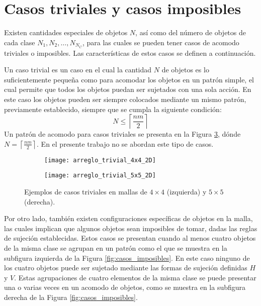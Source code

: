 \section{Casos triviales y casos imposibles}
\label{sec:casos_triviales_e_imposibles}
%
%
Existen cantidades especiales de objetos $N$, así como del número de objetos de cada clase $N_1, N_2, \ldots, N_{N_C}$, para las cuales se pueden tener casos de acomodo triviales o imposibles.
Las características de estos casos se definen a continuación.

Un caso trivial es un caso en el cual la cantidad $N$ de objetos es lo suficientemente pequeña como para acomodar los objetos en un patrón simple, el cual permite que todos los objetos puedan ser sujetados con una sola acción.
En este caso los objetos pueden ser siempre colocados mediante un mismo patrón, previamente establecido, siempre que se cumpla la siguiente condición:
%
\begin{equation}
	\label{eq:condicion_triviales}
	N \leq \left\lceil \frac{nm}{2} \right\rceil
\end{equation}
%
Un patrón de acomodo para casos triviales se presenta en la Figura \ref{fig:casos_triviales}, dónde $N = \left\lceil \frac{nm}{2} \right\rceil$.
En el presente trabajo no se abordan este tipo de casos.
%
\begin{figure}[H]
	\begin{subfigure}{0.3\textwidth}
		\texttt{[image: arreglo\_trivial\_4x4\_2D]}%
		\label{subfig:trivial_4x4}%
	\end{subfigure}%
	\hspace{2.2cm}
	\begin{subfigure}{0.3\textwidth}
		\texttt{[image: arreglo\_trivial\_5x5\_2D]}%
		\label{subfig:trivial_5x5}%
	\end{subfigure}%
	\caption{Ejemplos de casos triviales en mallas de $4\times 4$ (izquierda) y $5\times 5$ (derecha).}
	\label{fig:casos_triviales}%
\end{figure}
%
Por otro lado, también existen configuraciones específicas de objetos en la malla, las cuales implican que algunos objetos sean imposibles de tomar, dadas las reglas de sujeción establecidas.
Estos casos se presentan cuando al menos cuatro objetos de la misma clase se agrupan en un patrón como el que se muestra en la subfigura izquierda de la Figura \ref{fig:casos_imposibles}.
En este caso ninguno de los cuatro objetos puede ser sujetado mediante las formas de sujeción definidas $H$ y $V$.
Estas agrupaciones de cuatro elementos de la misma clase se puede presentar una o varias veces en un acomodo de objetos, como se muestra en la subfigura derecha de la Figura \ref{fig:casos_imposibles}.

